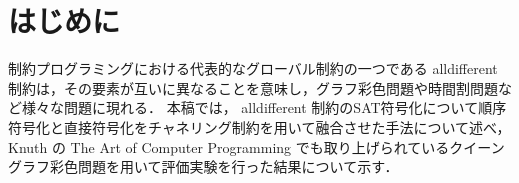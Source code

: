 \section{はじめに}

制約プログラミングにおける代表的なグローバル制約の一つである alldifferent 制約は，その要素が互いに異なることを意味し，グラフ彩色問題や時間割問題など様々な問題に現れる．
本稿では， alldifferent 制約のSAT符号化について順序符号化と直接符号化をチャネリング制約を用いて融合させた手法について述べ，Knuth の The Art of Computer Programming \cite{Knuth:TAOCP:SAT}でも取り上げられているクイーングラフ彩色問題\cite{Tamura:queen}を用いて評価実験を行った結果について示す．

